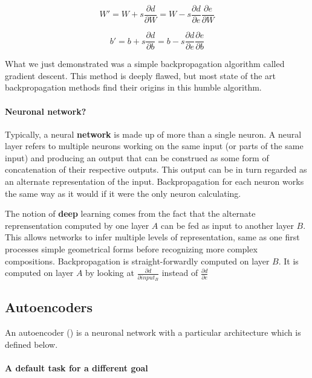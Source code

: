 \documentclass[conference]{IEEEtran}
\begin{document}
\begin{equation}
     W'=W + s\frac{\partial d}{\partial W}=W-s\frac{\partial d}{\partial e}\frac{\partial e}{\partial W}
\end{equation}

\begin{equation}
     b'=b + s\frac{\partial d}{\partial b}=b-s\frac{\partial d}{\partial e}\frac{\partial e}{\partial b}
\end{equation}

What we just demonstrated was a simple backpropagation algorithm called gradient
descent. This method is deeply flawed, but most state of the art backpropagation
methods find their origins in this humble algorithm.

\paragraph{Neuronal network?}

Typically, a neural \textbf{network} is made up of more than a single neuron. A
neural layer refers to multiple neurons working on the same input (or parts of
the same input) and producing an output that can be construed as some form of
concatenation of their respective outputs. This output can be in turn regarded
as an alternate representation of the input. Backpropagation for each neuron
works the same way as it would if it were the only neuron calculating.

The notion of \textbf{deep} learning comes from the fact that the alternate
reprensentation computed by one layer $A$ can be fed as input to another layer $B$.
This allows networks to infer multiple levels of representation, same as one
first processes simple geometrical forms before recognizing more complex
compositions. Backpropagation is straight-forwardly computed on layer $B$. It is
computed on layer $A$ by looking at $\frac{\partial d}{\partial input_B}$
instead of $\frac{\partial d}{\partial e}$
\subsection{Autoencoders}

An autoencoder (\cite{Hinton504}) is a neuronal network with a particular architecture which is defined below.

\paragraph{A default task for a different goal}
\end{document}
